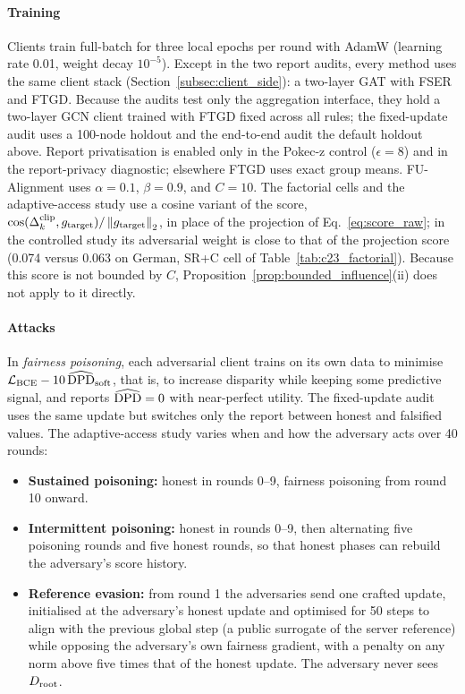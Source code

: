 \paragraph{Training}
Clients train full-batch for three local epochs per round with AdamW (learning rate 0.01, weight decay $10^{-5}$). Except in the two report audits, every method uses the same client stack (Section~\ref{subsec:client_side}): a two-layer GAT with FSER and FTGD. Because the audits test only the aggregation interface, they hold a two-layer GCN client trained with FTGD fixed across all rules; the fixed-update audit uses a 100-node holdout and the end-to-end audit the default holdout above. Report privatisation is enabled only in the Pokec-z control ($\epsilon = 8$) and in the report-privacy diagnostic; elsewhere FTGD uses exact group means. FU-Alignment uses $\alpha = 0.1$, $\beta = 0.9$, and $C = 10$. The factorial cells and the adaptive-access study use a cosine variant of the score, $\cos(\Delta_k^{\mathrm{clip}}, g_{\mathrm{target}})/\left\lVert g_{\mathrm{target}} \right\rVert_2$, in place of the projection of Eq.~\eqref{eq:score_raw}; in the controlled study its adversarial weight is close to that of the projection score (0.074 versus 0.063 on German, SR+C cell of Table~\ref{tab:c23_factorial}). Because this score is not bounded by $C$, Proposition~\ref{prop:bounded_influence}(ii) does not apply to it directly.

\paragraph{Attacks}
In \emph{fairness poisoning}, each adversarial client trains on its own data to minimise $\mathcal{L}_{\mathrm{BCE}} - 10\,\widehat{\mathrm{DPD}}_{\mathrm{soft}}$, that is, to increase disparity while keeping some predictive signal, and reports $\widehat{\mathrm{DPD}} = 0$ with near-perfect utility. The fixed-update audit uses the same update but switches only the report between honest and falsified values. The adaptive-access study varies when and how the adversary acts over 40 rounds:
\begin{itemize}[leftmargin=*]
    \item \textbf{Sustained poisoning:} honest in rounds 0--9, fairness poisoning from round 10 onward.
    \item \textbf{Intermittent poisoning:} honest in rounds 0--9, then alternating five poisoning rounds and five honest rounds, so that honest phases can rebuild the adversary's score history.
    \item \textbf{Reference evasion:} from round 1 the adversaries send one crafted update, initialised at the adversary's honest update and optimised for 50 steps to align with the previous global step (a public surrogate of the server reference) while opposing the adversary's own fairness gradient, with a penalty on any norm above five times that of the honest update. The adversary never sees $D_{\mathrm{root}}$.
\end{itemize}

